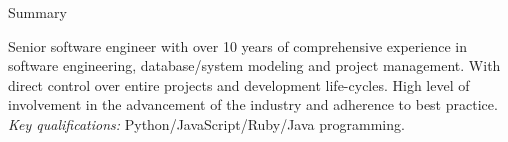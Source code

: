 \documentclass[]{mcdowellcv}
\begin{document}
    \makeheader
    \label{Contact}

    \vspace*{20pt}
    \begin{cvsection}{Summary}
        \label{Summary}
        \begin{cvsubsection}{}{}{}
            Senior software engineer with over 10 years of comprehensive experience in software engineering, {database}/system modeling and project management. With direct control over entire projects and development life-cycles. High level of involvement in the advancement of the industry and adherence to best practice.\\
            \textit{Key qualifications:} Python/JavaScript/Ruby/Java programming.
        \end{cvsubsection}
    \end{cvsection}
    \vspace*{20pt}
\end{document}
